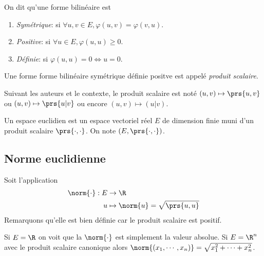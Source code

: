 \begin{definition}
	On dit qu'une forme bilinéaire est 
	\begin{enumerate}[label=$(\roman*)$]
		\item \emph{Symétrique}: si $\forall u,v\in E, \varphi(u,v) = \varphi(v,u)$. 
		\item \emph{Positive}: si $\forall u\in E, \varphi(u,u) \geq 0$.
		\item \emph{Définie}: si $\varphi(u,u) =0 \Leftrightarrow u=0$. 
	\end{enumerate}
	Une forme forme bilinéaire symétrique définie positve est appelé \emph{produit scalaire}. 
\end{definition}

Suivant les auteurs et le contexte, le produit scalaire est noté $(u,v) \mapsto \prs{u,v}$ ou $(u,v) \mapsto \prs{u|v}$ ou encore $(u,v) \mapsto (u|v)$.

\begin{definition}
	Un espace euclidien est un espace vectoriel réel $E$ de dimension finie muni d'un produit scalaire $\prs{\cdot,\cdot}$. On note $(E,\prs{\cdot,\cdot})$.
\end{definition}

\begin{exemple}
	\pl{\rep{5cm}} %
\end{exemple}

\subsection{Norme euclidienne}

Soit l'application 
\begin{align*} 
	\norm{\cdot}: E &\to \R \\ u&\mapsto \norm{u} = \sqrt{\prs{u,u}}
\end{align*}
Remarquons qu'elle est bien définie car le produit scalaire est positif. %
\begin{exemple}
	Si $E=\R$ on voit que la $\norm{\cdot}$ est simplement la valeur absolue. Si $E = \R^n$ avec le produit scalaire canonique alors $\norm{(x_1,\cdots,x_n)} = \sqrt{ x_1^2 + \cdots + x_n^2 }$.
\end{exemple}

